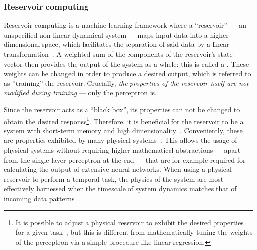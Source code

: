 \subsubsection{Reservoir computing}
Reservoir computing is a machine learning framework where a ``reservoir'' --- an unspecified non-linear dynamical system --- maps input data into a higher-dimensional space, which facilitates the separation of said data by a linear transformation~\cite{KUR-24}.
A weighted sum of the components of the reservoir's state vector then provides the output of the system as a whole: this is called a .
These weights can be changed in order to produce a desired output, which is referred to as ``training'' the reservoir.
Crucially, \textit{the properties of the reservoir itself are not modified during training} --- only the perceptron is. \par
Since the reservoir acts as a ``black box'', its properties can not be changed to obtain the desired response\footnote{
	It is possible to adjust a physical reservoir to exhibit the desired properties for a given task~\cite{AdaptiveProgrammableRC,gartside2022reconfigurable}, but this is different from mathematically tuning the weights of the perceptron via a simple procedure like linear regression.
}.
Therefore, it is beneficial for the reservoir to be a system with short-term memory and high dimensionality~\cite{NeuromorphicAFMspintronics,RC_RecentAdvances}.
Conveniently, these are properties exhibited by many physical systems~\cite{RC_DipoleNanomagnets,RC_PassiveFrustratedNM,RC_ASI,RC_RecentAdvances,NeuromorphicOscillators,VowelRecognition4STO,RC_DiffusiveMemristors,RC_MemristorTemporal,gartside2022reconfigurable}.
This allows the usage of physical systems without requiring higher mathematical abstractions --- apart from the single-layer perceptron at the end --- that are for example required for calculating the output of extensive neural networks.
When using a physical reservoir to perform a temporal task, the physics of the system are most effectively harnessed when the timescale of system dynamics matches that of incoming data patterns~\cite{KUR-24}.

